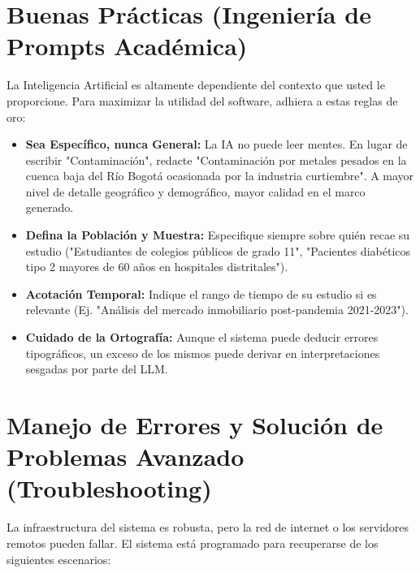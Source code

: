 \documentclass[12pt,a4paper]{article}
\begin{document}
\newpage
\section{Buenas Prácticas (Ingeniería de Prompts Académica)}
La Inteligencia Artificial es altamente dependiente del contexto que usted le proporcione. Para maximizar la utilidad del software, adhiera a estas reglas de oro:

\begin{itemize}
    \item \textbf{Sea Específico, nunca General:} La IA no puede leer mentes. En lugar de escribir "Contaminación", redacte "Contaminación por metales pesados en la cuenca baja del Río Bogotá ocasionada por la industria curtiembre". A mayor nivel de detalle geográfico y demográfico, mayor calidad en el marco generado.
    \item \textbf{Defina la Población y Muestra:} Especifique siempre sobre quién recae su estudio ("Estudiantes de colegios públicos de grado 11", "Pacientes diabéticos tipo 2 mayores de 60 años en hospitales distritales").
    \item \textbf{Acotación Temporal:} Indique el rango de tiempo de su estudio si es relevante (Ej. "Análisis del mercado inmobiliario post-pandemia 2021-2023").
    \item \textbf{Cuidado de la Ortografía:} Aunque el sistema puede deducir errores tipográficos, un exceso de los mismos puede derivar en interpretaciones sesgadas por parte del LLM.
\end{itemize}

\section{Manejo de Errores y Solución de Problemas Avanzado (Troubleshooting)}

La infraestructura del sistema es robusta, pero la red de internet o los servidores remotos pueden fallar. El sistema está programado para recuperarse de los siguientes escenarios:
\end{document}

